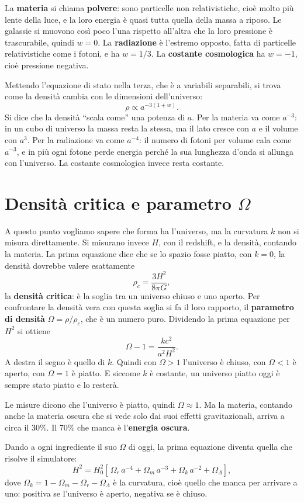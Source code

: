 \documentclass[12pt,a4paper]{article}
\begin{document}
La \textbf{materia} si chiama \textbf{polvere}: sono particelle non relativistiche, cioè molto più lente della luce, e la loro energia è quasi tutta quella della massa a riposo. Le galassie si muovono così poco l'una rispetto all'altra che la loro pressione è trascurabile, quindi $w = 0$. La \textbf{radiazione} è l'estremo opposto, fatta di particelle relativistiche come i fotoni, e ha $w = 1/3$. La \textbf{costante cosmologica} ha $w = -1$, cioè pressione negativa.

Mettendo l'equazione di stato nella terza, che è a variabili separabili, si trova come la densità cambia con le dimensioni dell'universo:
\[ \rho \propto a^{-3(1+w)} . \]
Si dice che la densità ``scala come'' una potenza di $a$. Per la materia va come $a^{-3}$: in un cubo di universo la massa resta la stessa, ma il lato cresce con $a$ e il volume con $a^3$. Per la radiazione va come $a^{-4}$: il numero di fotoni per volume cala come $a^{-3}$, e in più ogni fotone perde energia perché la sua lunghezza d'onda si allunga con l'universo. La costante cosmologica invece resta costante.

\section{Densità critica e parametro $\Omega$}
A questo punto vogliamo sapere che forma ha l'universo, ma la curvatura $k$ non si misura direttamente. Si misurano invece $H$, con il redshift, e la densità, contando la materia. La prima equazione dice che se lo spazio fosse piatto, con $k = 0$, la densità dovrebbe valere esattamente
\[ \rho_c = \frac{3H^2}{8\pi G} , \]
la \textbf{densità critica}: è la soglia tra un universo chiuso e uno aperto. Per confrontare la densità vera con questa soglia si fa il loro rapporto, il \textbf{parametro di densità} $\Omega = \rho/\rho_c$, che è un numero puro. Dividendo la prima equazione per $H^2$ si ottiene
\[ \Omega - 1 = \frac{k c^2}{a^2 H^2} . \]
A destra il segno è quello di $k$. Quindi con $\Omega > 1$ l'universo è chiuso, con $\Omega < 1$ è aperto, con $\Omega = 1$ è piatto. E siccome $k$ è costante, un universo piatto oggi è sempre stato piatto e lo resterà.

Le misure dicono che l'universo è piatto, quindi $\Omega \approx 1$. Ma la materia, contando anche la materia oscura che si vede solo dai suoi effetti gravitazionali, arriva a circa il 30\%. Il 70\% che manca è l'\textbf{energia oscura}.

Dando a ogni ingrediente il suo $\Omega$ di oggi, la prima equazione diventa quella che risolve il simulatore:
\[ H^2 = H_0^2 \left[\,\Omega_r\, a^{-4} + \Omega_m\, a^{-3} + \Omega_k\, a^{-2} + \Omega_\Lambda \right], \]
dove $\Omega_k = 1 - \Omega_m - \Omega_r - \Omega_\Lambda$ è la curvatura, cioè quello che manca per arrivare a uno: positiva se l'universo è aperto, negativa se è chiuso.
\end{document}
